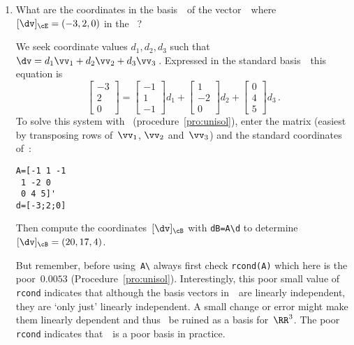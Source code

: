 \begin{example}
\begin{enumerate}
\item What are the coordinates in the basis~\cB\ of the vector~\dv\ where \([\dv]_\cE=(-3,2,0)\) in the ~\cE?
\begin{solution} 
We seek coordinate values \(d_1,d_2,d_3\) such that \(\dv=d_1\vv_1+d_2\vv_2+d_3\vv_3\)\,. 
Expressed in the standard basis~\cE\ this equation is
\begin{equation*}
\begin{bmatrix} -3\\2\\0 \end{bmatrix}=
\begin{bmatrix} -1\\1\\-1 \end{bmatrix}d_1+
\begin{bmatrix} 1\\-2\\0 \end{bmatrix}d_2+
\begin{bmatrix} 0\\4\\5 \end{bmatrix}d_3\,.
\end{equation*}
To solve this system with \script\ (procedure~\ref{pro:unisol}), enter the matrix (easiest by transposing rows of~\(\vv_1\), \(\vv_2\) and~\(\vv_3\)) and the standard coordinates of~\dv:
\begin{verbatim}
A=[-1 1 -1
 1 -2 0
 0 4 5]'
d=[-3;2;0]
\end{verbatim}
\setbox\ajrqrbox\hbox{}%
\marginpar{\usebox{\ajrqrbox}}%
Then compute the coordinates~\([\dv]_\cB\) with \verb|dB=A\d| to determine \([\dv]_\cB=(20,17,4)\).

But remember, before using~\verb|A\| always first check \verb|rcond(A)| which here is the poor~\(0.0053\) (Procedure~\ref{pro:unisol}).
Interestingly, this poor small value of \verb|rcond| indicates that although the basis vectors in~\cB\ are linearly independent, they are `only just' linearly independent.
A small change or error might make them linearly dependent and thus \cB~be ruined as a basis for~\(\RR^3\).
The poor \verb|rcond| indicates that~\cB\ is a poor basis in practice.
\end{solution}
\end{enumerate}
\end{example}





